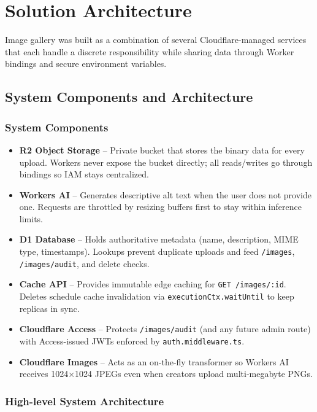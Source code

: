 \documentclass[12pt]{article}
\begin{document}
\section{Solution Architecture}
Image gallery was built as a combination of several Cloudflare-managed services that each handle a discrete responsibility while sharing data through Worker bindings and secure environment variables.

\subsection{System Components and Architecture}
\subsubsection{System Components}
\begin{itemize}[leftmargin=*]
  \item \textbf{R2 Object Storage} – Private bucket that stores the binary data for every upload. Workers never expose the bucket directly; all reads/writes go through bindings so IAM stays centralized.
  \item \textbf{Workers AI} – Generates descriptive alt text when the user does not provide one. Requests are throttled by resizing buffers first to stay within inference limits.
  \item \textbf{D1 Database} – Holds authoritative metadata (name, description, MIME type, timestamps). Lookups prevent duplicate uploads and feed \texttt{/images}, \texttt{/images/audit}, and delete checks.
  \item \textbf{Cache API} – Provides immutable edge caching for \texttt{GET /images/:id}. Deletes schedule cache invalidation via \texttt{executionCtx.waitUntil} to keep replicas in sync.
  \item \textbf{Cloudflare Access} – Protects \texttt{/images/audit} (and any future admin route) with Access-issued JWTs enforced by \texttt{auth.middleware.ts}.
  \item \textbf{Cloudflare Images} – Acts as an on-the-fly transformer so Workers AI receives 1024×1024 JPEGs even when creators upload multi‑megabyte PNGs.
\end{itemize}

\subsubsection{High-level System Architecture}
\end{document}
